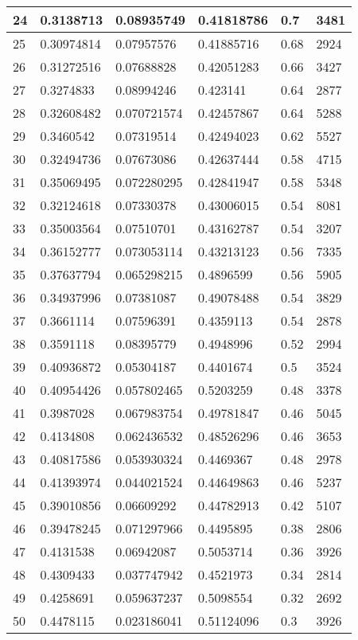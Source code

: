 \begin{longtable}{|l|l|l|l|l|l|}
24 & 0.3138713 & 0.08935749 & 0.41818786 & 0.7 & 3481 \\ \hline 
25 & 0.30974814 & 0.07957576 & 0.41885716 & 0.68 & 2924 \\ \hline 
26 & 0.31272516 & 0.07688828 & 0.42051283 & 0.66 & 3427 \\ \hline 
27 & 0.3274833 & 0.08994246 & 0.423141 & 0.64 & 2877 \\ \hline 
28 & 0.32608482 & 0.070721574 & 0.42457867 & 0.64 & 5288 \\ \hline 
29 & 0.3460542 & 0.07319514 & 0.42494023 & 0.62 & 5527 \\ \hline 
30 & 0.32494736 & 0.07673086 & 0.42637444 & 0.58 & 4715 \\ \hline 
31 & 0.35069495 & 0.072280295 & 0.42841947 & 0.58 & 5348 \\ \hline 
32 & 0.32124618 & 0.07330378 & 0.43006015 & 0.54 & 8081 \\ \hline 
33 & 0.35003564 & 0.07510701 & 0.43162787 & 0.54 & 3207 \\ \hline 
34 & 0.36152777 & 0.073053114 & 0.43213123 & 0.56 & 7335 \\ \hline 
35 & 0.37637794 & 0.065298215 & 0.4896599 & 0.56 & 5905 \\ \hline 
36 & 0.34937996 & 0.07381087 & 0.49078488 & 0.54 & 3829 \\ \hline 
37 & 0.3661114 & 0.07596391 & 0.4359113 & 0.54 & 2878 \\ \hline 
38 & 0.3591118 & 0.08395779 & 0.4948996 & 0.52 & 2994 \\ \hline 
39 & 0.40936872 & 0.05304187 & 0.4401674 & 0.5 & 3524 \\ \hline 
40 & 0.40954426 & 0.057802465 & 0.5203259 & 0.48 & 3378 \\ \hline 
41 & 0.3987028 & 0.067983754 & 0.49781847 & 0.46 & 5045 \\ \hline 
42 & 0.4134808 & 0.062436532 & 0.48526296 & 0.46 & 3653 \\ \hline 
43 & 0.40817586 & 0.053930324 & 0.4469367 & 0.48 & 2978 \\ \hline 
44 & 0.41393974 & 0.044021524 & 0.44649863 & 0.46 & 5237 \\ \hline 
45 & 0.39010856 & 0.06609292 & 0.44782913 & 0.42 & 5107 \\ \hline 
46 & 0.39478245 & 0.071297966 & 0.4495895 & 0.38 & 2806 \\ \hline 
47 & 0.4131538 & 0.06942087 & 0.5053714 & 0.36 & 3926 \\ \hline 
48 & 0.4309433 & 0.037747942 & 0.4521973 & 0.34 & 2814 \\ \hline 
49 & 0.4258691 & 0.059637237 & 0.5098554 & 0.32 & 2692 \\ \hline 
50 & 0.4478115 & 0.023186041 & 0.51124096 & 0.3 & 3926 \\ \hline 
\end{longtable}